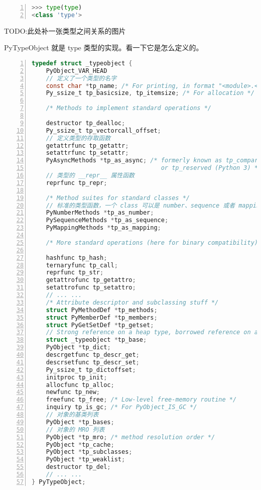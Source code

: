 \begin{lstlisting}[language=Python, numbers=left, numbersep=1em, numberstyle=\footnotesize , breaklines=true]
>>> type(type)
<class 'type'>
\end{lstlisting}


TODO:此处补一张类型之间关系的图片

PyTypeObject 就是 type 类型的实现。看一下它是怎么定义的。

\begin{lstlisting}[language=C, numbers=left, numbersep=1em, numberstyle=\footnotesize , breaklines=true]
typedef struct _typeobject {
    PyObject_VAR_HEAD
    // 定义了一个类型的名字
    const char *tp_name; /* For printing, in format "<module>.<name>" */
    Py_ssize_t tp_basicsize, tp_itemsize; /* For allocation */

    /* Methods to implement standard operations */

    destructor tp_dealloc;
    Py_ssize_t tp_vectorcall_offset;
    // 定义类型的存取函数
    getattrfunc tp_getattr;
    setattrfunc tp_setattr;
    PyAsyncMethods *tp_as_async; /* formerly known as tp_compare (Python 2)
                                    or tp_reserved (Python 3) */
    // 类型的 __repr__ 属性函数
    reprfunc tp_repr;

    /* Method suites for standard classes */
    // 标准的类型函数，一个 class 可以是 number、sequence 或者 mapping 类型
    PyNumberMethods *tp_as_number;
    PySequenceMethods *tp_as_sequence;
    PyMappingMethods *tp_as_mapping;

    /* More standard operations (here for binary compatibility) */

    hashfunc tp_hash;
    ternaryfunc tp_call;
    reprfunc tp_str;
    getattrofunc tp_getattro;
    setattrofunc tp_setattro;
	// ... ...
    /* Attribute descriptor and subclassing stuff */
    struct PyMethodDef *tp_methods;
    struct PyMemberDef *tp_members;
    struct PyGetSetDef *tp_getset;
    // Strong reference on a heap type, borrowed reference on a static type
    struct _typeobject *tp_base;
    PyObject *tp_dict;
    descrgetfunc tp_descr_get;
    descrsetfunc tp_descr_set;
    Py_ssize_t tp_dictoffset;
    initproc tp_init;
    allocfunc tp_alloc;
    newfunc tp_new;
    freefunc tp_free; /* Low-level free-memory routine */
    inquiry tp_is_gc; /* For PyObject_IS_GC */
    // 对象的基类列表
    PyObject *tp_bases;
    // 对象的 MRO 列表
    PyObject *tp_mro; /* method resolution order */
    PyObject *tp_cache;
    PyObject *tp_subclasses;
    PyObject *tp_weaklist;
    destructor tp_del;
    // ... ...
} PyTypeObject;
\end{lstlisting}

